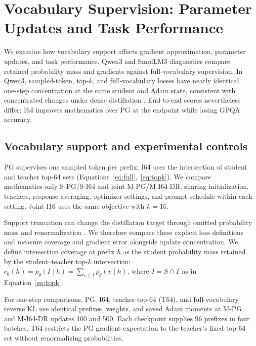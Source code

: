 \section{Vocabulary Supervision: Parameter Updates and Task Performance}
\label{sec:density}

We examine how vocabulary support affects gradient approximation, parameter updates, and task performance. Qwen3 and SmolLM3 diagnostics compare retained probability mass and gradients against full-vocabulary supervision. In Qwen3, sampled-token, top-$k$, and full-vocabulary losses have nearly identical one-step concentration at the same student and Adam state, consistent with concentrated changes under dense distillation \citep{yu2026denseupdates}. End-to-end scores nevertheless differ: I64 improves mathematics over PG at the endpoint while losing GPQA accuracy.

\subsection{Vocabulary support and experimental controls}

PG supervises one sampled token per prefix; I64 uses the intersection of student and teacher top-64 sets (Equations~\ref{eq:full},~\ref{eq:topk}). We compare mathematics-only S-PG/S-I64 and joint M-PG/M-I64-DR, sharing initialization, teachers, response averaging, optimizer settings, and prompt schedule within each setting. Joint I16 uses the same objective with $k=16$.

Support truncation can change the distillation target through omitted probability mass and renormalization \citep{anshumann2025sparse,huang2026tailaware}. We therefore compare these explicit loss definitions and measure coverage and gradient error alongside update concentration. We define intersection coverage at prefix $h$ as the student probability mass retained by the student--teacher top-$k$ intersection: $c_k(h)=p_\theta(I\mid h)=\sum_{v\in I}p_\theta(v\mid h)$, where $I=S\cap T$ as in Equation~\ref{eq:topk}.

For one-step comparisons, PG, I64, teacher-top-64 (T64), and full-vocabulary reverse KL use identical prefixes, weights, and saved Adam moments at M-PG and M-I64-DR updates 100 and 500. Each checkpoint supplies 96 prefixes in four batches. T64 restricts the PG gradient expectation to the teacher's fixed top-64 set without renormalizing probabilities.



